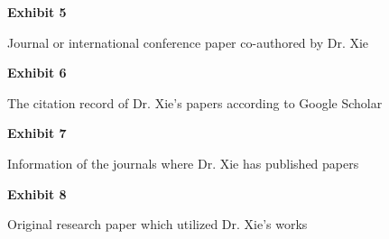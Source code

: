 \documentclass{article}
\begin{document}


\vspace*{\fill}

\begin{center}

{\LARGE \bf
Exhibit 5
}

\vspace{10\baselineskip}

{\large Journal or international conference paper co-authored by Dr. Xie}

\end{center}
\vspace*{\fill}




\vspace*{\fill}

\begin{center}

{\LARGE \bf
Exhibit 6
}

\vspace{10\baselineskip}

{\large The citation record of Dr. Xie’s papers according to Google Scholar}

\end{center}
\vspace*{\fill}



\vspace*{\fill}

\begin{center}

{\LARGE \bf
Exhibit 7
}

\vspace{10\baselineskip}

{\large Information of the journals where Dr. Xie has published papers }

\end{center}
\vspace*{\fill}



\vspace*{\fill}

\begin{center}

{\LARGE \bf
Exhibit 8
}

\vspace{10\baselineskip}

{\large Original research paper which utilized Dr. Xie’s works}

\end{center}
\vspace*{\fill}
\end{document}
